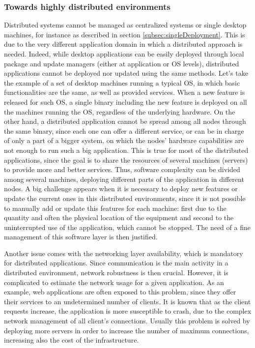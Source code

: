 \subsubsection{Towards highly distributed environments}
\label{sec:distDeployment}
Distributed systems cannot be managed as centralized systems or single desktop machines, for instance as described in section \ref{subsec:singleDeployment}.
This is due to the very different application domain in which a distributed approach is needed.
Indeed, while desktop applications can be easily deployed through local package and update managers (either at application or OS levels), distributed applications cannot be deployed nor updated using the same methods.
Let's take the example of a set of desktop machines running a typical OS, in which basic functionalities are the same, as well as provided services.
When a new feature is released for such OS, a single binary including the new feature is deployed on all the machines running the OS, regardless of the underlying hardware.
On the other hand, a distributed application cannot be spread among all nodes through the same binary, since each one can offer a different service, or can be in charge of only a part of a bigger system, on which the nodes' hardware capabilities are not enough to run such a big application.
This is true for most of the distributed applications, since the goal is to share the resources of several machines (servers) to provide more and better services.
Thus, software complexity can be divided among several machines, deploying different parts of the application in different nodes.
A big challenge appears when it is necessary to deploy new features or update the current ones in this distributed environments, since it is not possible to manually add or update this features for each machine: first due to the quantity and often the physical location of the equipment and second to the uninterrupted use of the application, which cannot be stopped.
The need of a fine management of this software layer is then justified.

Another issue comes with the networking layer availability, which is mandatory for distributed applications.
Since communication is the main activity in a distributed environment, network robustness is then crucial.
However, it is complicated to estimate the network usage for a given application.
As an example, web applications are often exposed to this problem, since they offer their services to an undetermined number of clients.
It is known that as the client requests increase, the application is more susceptible to crash, due to the complex network management of all client's connections.
Usually this problem is solved by deploying more servers in order to increase the number of maximum connections, increasing also the cost of the infrastructure.

